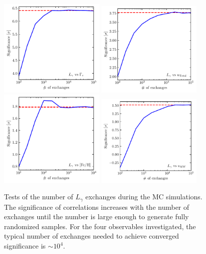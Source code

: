 \documentclass[doublespace,nopageskip]{VTthesis} %
\begin{document}
\begin{appendices}
\begin{figure}
    \centering
    \includegraphics[width=0.45\textwidth]{Figures/Globular/kendall/kendall_vs_encounter_rate.pdf}
    \includegraphics[width=0.45\textwidth]{Figures/Globular/kendall/kendall_vs_total_radiation.pdf}
    \includegraphics[width=0.45\textwidth]{Figures/Globular/kendall/kendall_vs_metallicity.pdf}
    \includegraphics[width=0.45\textwidth]{Figures/Globular/kendall/kendall_vs_isrf_radiation.pdf}
    \caption{Tests of the number of $L_\gamma$ exchanges during the MC simulations. The significance of correlations increases with the number of exchanges until the number is large enough to generate fully randomized samples. For the four observables investigated, the typical number of exchanges needed to achieve converged significance is $\sim 10^4$.}
    \label{fig:exchange}
\end{figure}


\end{appendices}
\end{document}
